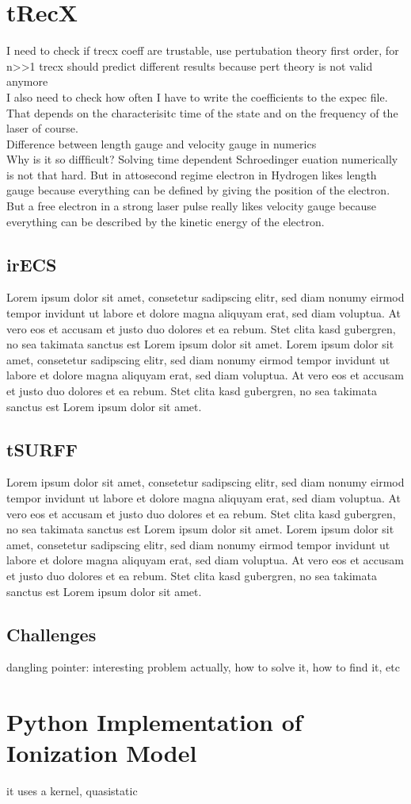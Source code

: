 \section{tRecX}
I need to check if trecx coeff are trustable, use pertubation theory first order, for n>>1 trecx should predict different results because pert theory is not valid anymore\\
I also need to check how often I have to write the coefficients to the expec file. That depends on the characterisitc time of the state and on the frequency of the laser of course.\\
Difference between length gauge and velocity gauge in numerics\\
Why is it so diffficult? Solving time dependent Schroedinger euation numerically is not that hard. But in attosecond regime electron in Hydrogen likes length gauge because everything can be defined by giving the position of the electron. 
But a free electron in a strong laser pulse really likes velocity gauge because everything can be described by the kinetic energy of the electron.
\subsection{irECS}
Lorem ipsum dolor sit amet, consetetur sadipscing elitr, sed diam nonumy eirmod tempor invidunt ut labore et dolore magna aliquyam erat, sed diam voluptua. At vero eos et accusam et justo duo dolores et ea rebum. Stet clita kasd gubergren, no sea takimata sanctus est Lorem ipsum dolor sit amet. Lorem ipsum dolor sit amet, consetetur sadipscing elitr, sed diam nonumy eirmod tempor invidunt ut labore et dolore magna aliquyam erat, sed diam voluptua. At vero eos et accusam et justo duo dolores et ea rebum. Stet clita kasd gubergren, no sea takimata sanctus est Lorem ipsum dolor sit amet.
\subsection{tSURFF}
Lorem ipsum dolor sit amet, consetetur sadipscing elitr, sed diam nonumy eirmod tempor invidunt ut labore et dolore magna aliquyam erat, sed diam voluptua. At vero eos et accusam et justo duo dolores et ea rebum. Stet clita kasd gubergren, no sea takimata sanctus est Lorem ipsum dolor sit amet. Lorem ipsum dolor sit amet, consetetur sadipscing elitr, sed diam nonumy eirmod tempor invidunt ut labore et dolore magna aliquyam erat, sed diam voluptua. At vero eos et accusam et justo duo dolores et ea rebum. Stet clita kasd gubergren, no sea takimata sanctus est Lorem ipsum dolor sit amet.
\subsection{Challenges}
dangling pointer: interesting problem actually, how to solve it, how to find it, etc

\newpage
\section{Python Implementation of Ionization Model}
it uses a kernel, quasistatic
